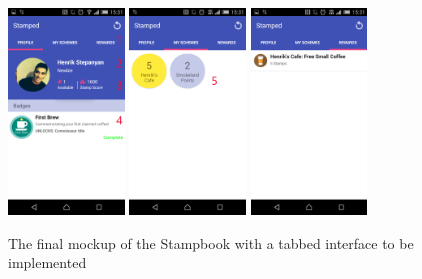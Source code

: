 \begin{figure}[H]
 \centering
  \includegraphics[width=0.275\textwidth]{img/moremock2.png}
   \includegraphics[width=0.275\textwidth]{img/finalmock.png}
    \includegraphics[width=0.275\textwidth]{img/moremock1.png}
     \caption{The final mockup of the Stampbook with a tabbed interface to be implemented}
     \label{fig:wireframe3}
\end{figure}

